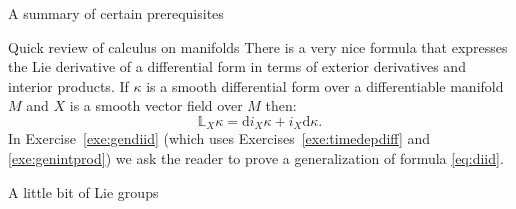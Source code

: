 \documentclass[oneside,a4paper,11pt]{amsbook}
\newcommand{\dd}{\mathrm d}
\theoremstyle{remark}\newtheorem{exercise}{Exercise}[chapter]
\theoremstyle{plain}\newtheorem{teo}{Theorem}[section]
\theoremstyle{plain}\newtheorem{lem}[teo]{Lemma}
\theoremstyle{plain}\newtheorem{prop}[teo]{Proposition}
\theoremstyle{plain}\newtheorem{cor}[teo]{Corollary}
\theoremstyle{definition}\newtheorem{defin}[teo]{Definition}
\theoremstyle{remark}\newtheorem{rem}[teo]{Remark}
\theoremstyle{definition}\newtheorem{notation}[teo]{Notation}
\theoremstyle{definition}\newtheorem{convention}[teo]{Convention}
\theoremstyle{definition}\newtheorem{example}[teo]{Example}
\numberwithin{section}{chapter}
\numberwithin{equation}{section}
\begin{document}
\begin{chapter}{A summary of certain prerequisites}
\begin{section}{Quick review of calculus on manifolds}
There is a very nice formula that expresses the Lie derivative of a differential form in terms of exterior derivatives
and interior products. If $\kappa$ is a smooth differential form over a differentiable manifold $M$ and $X$ is a smooth vector field
over $M$ then:
\begin{equation}\label{eq:diid}
\mathbb L_X\kappa=\dd i_X\kappa+i_X\dd\kappa.
\end{equation}
In Exercise~\ref{exe:gendiid} (which uses Exercises~\ref{exe:timedepdiff} and \ref{exe:genintprod})
we ask the reader to prove a generalization of formula \eqref{eq:diid}.

\end{section}

\begin{section}{A little bit of Lie groups}
\label{sec:Liegroups}


\end{section}
\end{chapter}
\end{document}
